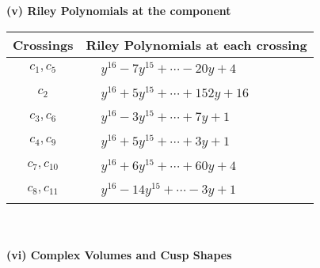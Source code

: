 \documentclass[1p]{elsarticle_modified}
\theoremstyle{definition}
\begin{document}
\newpage\renewcommand{\arraystretch}{1}
\flushleft \textbf{(v) Riley Polynomials at the component}\newline \\
\begin{tabular}{m{50pt}|m{274pt}}
Crossings & \hspace{64pt}Riley Polynomials at each crossing \\
\hline $$\begin{aligned}c_{1},c_{5}\end{aligned}$$&$\begin{aligned}
&y^{16}-7 y^{15}+\cdots-20 y+4
\end{aligned}$\\
\hline $$\begin{aligned}c_{2}\end{aligned}$$&$\begin{aligned}
&y^{16}+5 y^{15}+\cdots+152 y+16
\end{aligned}$\\
\hline $$\begin{aligned}c_{3},c_{6}\end{aligned}$$&$\begin{aligned}
&y^{16}-3 y^{15}+\cdots+7 y+1
\end{aligned}$\\
\hline $$\begin{aligned}c_{4},c_{9}\end{aligned}$$&$\begin{aligned}
&y^{16}+5 y^{15}+\cdots+3 y+1
\end{aligned}$\\
\hline $$\begin{aligned}c_{7},c_{10}\end{aligned}$$&$\begin{aligned}
&y^{16}+6 y^{15}+\cdots+60 y+4
\end{aligned}$\\
\hline $$\begin{aligned}c_{8},c_{11}\end{aligned}$$&$\begin{aligned}
&y^{16}-14 y^{15}+\cdots-3 y+1
\end{aligned}$\\
\hline
\end{tabular}\\~\\
\newpage\flushleft \textbf{(vi) Complex Volumes and Cusp Shapes}
\end{document}
